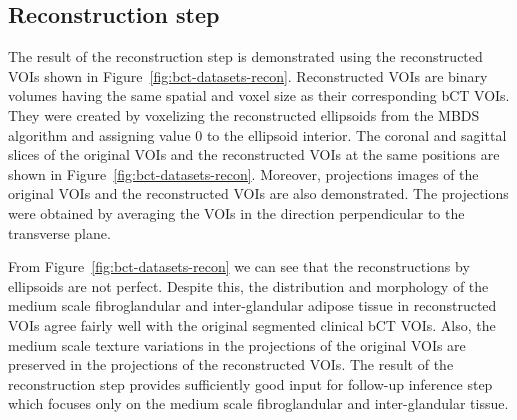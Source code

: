 \documentclass[journal]{IEEEtran}
\begin{document}
\subsection{Reconstruction step}
\label{chap4-sec4-sub1:result-reconstr-step}

The result of the reconstruction step is demonstrated using the
reconstructed VOIs shown in
Figure~\ref{fig:bct-datasets-recon}. Reconstructed VOIs are binary
volumes having the same spatial and voxel size as their corresponding
bCT VOIs. They were created by voxelizing the reconstructed ellipsoids
from the MBDS algorithm and assigning value 0 to the ellipsoid
interior. The coronal and sagittal slices of the original VOIs and the
reconstructed VOIs at the same positions are shown in
Figure~\ref{fig:bct-datasets-recon}. Moreover, projections images of
the original VOIs and the reconstructed VOIs are also
demonstrated. The projections were obtained by averaging the VOIs in
the direction perpendicular to the transverse plane.

From Figure~\ref{fig:bct-datasets-recon} we can see that the
reconstructions by ellipsoids are not perfect. Despite this, the
distribution and morphology of the medium scale fibroglandular and
inter-glandular adipose tissue in reconstructed VOIs agree fairly well
with the original segmented clinical bCT VOIs. Also, the medium scale
texture variations in the projections of the original VOIs are
preserved in the projections of the reconstructed VOIs. The result of
the reconstruction step provides sufficiently good input for follow-up
inference step which focuses only on the medium scale fibroglandular
and inter-glandular tissue.
\end{document}
